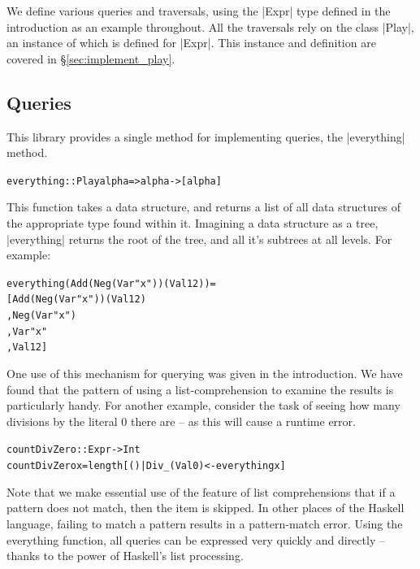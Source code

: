 \documentclass[preprint]{sigplanconf}
\newcommand{\C}[1]{\textsf{#1}}
\newcommand{\pic}[1]{\texttt{[image: \#1.eps]}}
\newenvironment{code}{\begin{alltt}\small}{\end{alltt}}
\begin{document}
We define various queries and traversals, using the |Expr| type defined in the introduction as an example throughout. All the traversals rely on the class |Play|, an instance of which is defined for |Expr|. This instance and definition are covered in \S\ref{sec:implement_play}.

\subsection{Queries}

This library provides a single method for implementing queries, the |everything| method.

\begin{code}
everything :: Play alpha => alpha -> [alpha]
\end{code}

This function takes a data structure, and returns a list of all data structures of the appropriate type found within it. Imagining a data structure as a tree, |everything| returns the root of the tree, and all it's subtrees at all levels. For example:

\begin{code}
everything (Add (Neg (Var "x")) (Val 12)) =
    [Add (Neg (Var "x")) (Val 12)
    ,Neg (Var "x")
    ,Var "x"
    ,Val 12]
\end{code}

One use of this mechanism for querying was given in the introduction. We have found that the pattern of using a list-comprehension to examine the results is particularly handy. For another example, consider the task of seeing how many divisions by the literal 0 there are -- as this will cause a runtime error.

\begin{code}
countDivZero :: Expr -> Int
countDivZero x = length [() | Div _ (Val 0) <- everything x]
\end{code}

Note that we make essential use of the feature of list comprehensions that if a pattern does not match, then the item is skipped. In other places of the Haskell language, failing to match a pattern results in a pattern-match error. Using the \C{everything} function, all queries can be expressed very quickly and directly -- thanks to the power of Haskell's list processing.
\end{document}
